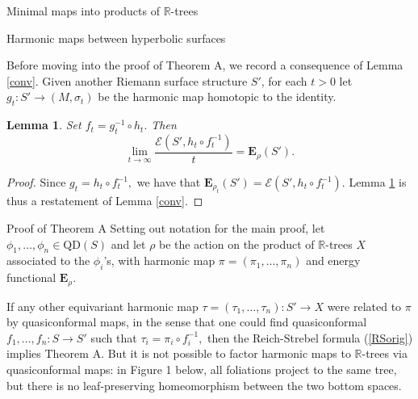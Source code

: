 \documentclass[10pt]{amsart}
\newcommand{\R}{\mathbb R}
\newtheorem{lem}[thm]{Lemma}
\theoremstyle{definition}
\begin{document}
\begin{section}{Minimal maps into products of $\R$-trees}
\begin{subsection}{Harmonic maps between hyperbolic surfaces}

Before moving into the proof of Theorem A, we record a consequence of Lemma \ref{conv}. Given another Riemann surface structure $S'$, for each $t>0$ let $g_t:S'\to (M,\sigma_t)$ be the harmonic map homotopic to the identity.
\begin{lem}\label{conv2}
Set $f_t=g_t^{-1}\circ h_t.$ Then
    $$\lim_{t\to\infty}\frac{\mathcal{E}(S',h_t\circ f_t^{-1})}{t}=\mathbf{E}_{\rho}(S').$$
\end{lem}
\begin{proof}
    Since $g_t=h_t\circ f_t^{-1},$ we have that $\mathbf{E}_{\rho_t}(S') = \mathcal{E}(S',h_t\circ f_t^{-1}).$ Lemma \ref{conv2} is thus a restatement of Lemma \ref{conv}.
\end{proof}
\end{subsection}


\begin{subsection}{Proof of Theorem A}
Setting out notation for the main proof, let $\phi_1,\dots, \phi_n\in \textrm{QD}(S)$ and let $\rho$ be the action on the product of $\R$-trees $X$ associated to the $\phi_i$'s, with harmonic map $\pi=(\pi_1,\dots, \pi_n)$ and energy functional $\mathbf{E}_\rho.$ 

If any other equivariant harmonic map $\tau=(\tau_1,\dots, \tau_n):S'\to X$ were related to $\pi$ by quasiconformal maps, in the sense that one could find quasiconformal $f_1,\dots, f_n:S\to S'$ such that $\tau_i = \pi_i\circ f_i^{-1},$ then the Reich-Strebel formula (\ref{RSorig}) implies Theorem A. But it is not possible to factor harmonic maps to $\R$-trees via quasiconformal maps: in Figure 1 below, all foliations project to the same tree, but there is no leaf-preserving homeomorphism between the two bottom spaces. 



\end{subsection}
\end{section}
\end{document}
